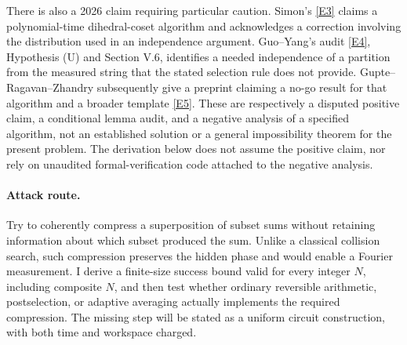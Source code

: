 \documentclass[11pt,a4paper]{article}
\newcommand{\eref}[2]{\hyperlink{extra:#1:#2}{[E#2]}}
\begin{document}
There is also a 2026 claim requiring particular caution. Simon's
\eref{statement}{3} claims a polynomial-time dihedral-coset algorithm and
acknowledges a correction involving the distribution used in an
independence argument. Guo--Yang's audit \eref{statement}{4}, Hypothesis (U) and
Section V.6, identifies a needed independence of a partition from the
measured string that the stated selection rule does not provide.
Gupte--Ragavan--Zhandry subsequently give a preprint claiming a no-go result
for that algorithm and a broader template \eref{statement}{5}.
These are respectively a disputed positive claim, a conditional lemma
audit, and a negative analysis of a specified algorithm, not an established
solution or a general impossibility theorem for the present problem.
The derivation below does not assume the positive claim, nor rely on
unaudited formal-verification code attached to the negative analysis.

\paragraph{Attack route.}
Try to coherently compress a superposition of subset sums without
retaining information about which subset produced the sum. Unlike a
classical collision search, such compression preserves the hidden phase
and would enable a Fourier measurement. I derive a finite-size success
bound valid for every integer $N$, including composite $N$, and then test
whether ordinary reversible arithmetic, postselection, or adaptive
averaging actually implements the required compression. The missing step
will be stated as a uniform circuit construction, with both time and
workspace charged.
\end{document}
